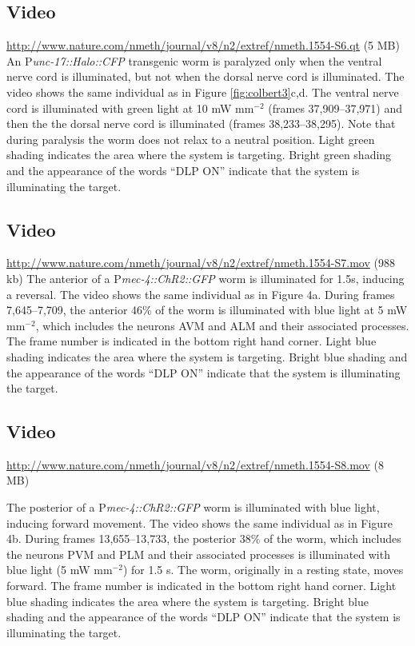\subsection{Video}\label{movie:colbert5} %

\url{http://www.nature.com/nmeth/journal/v8/n2/extref/nmeth.1554-S6.qt} (5 MB)
 An P\textit{unc-17::Halo::CFP} transgenic worm is paralyzed only when the ventral nerve cord is illuminated, but not when the dorsal nerve cord is illuminated. The video shows the same individual as in Figure \ref{fig:colbert3}c,d. The ventral nerve cord is illuminated with green light at 10 mW mm$^{−2}$ (frames 37,909–37,971) and then the the dorsal nerve cord is illuminated (frames 38,233–38,295). Note that during paralysis the worm does not relax to a neutral position. Light green shading indicates the area where the system is targeting. Bright green shading and the appearance of the words “DLP ON” indicate that the system is illuminating the target.

\subsection{Video}\label{movie:colbert6} %

\url{http://www.nature.com/nmeth/journal/v8/n2/extref/nmeth.1554-S7.mov} (988 kb)
The anterior of a P\textit{mec-4::ChR2::GFP} worm is illuminated for 1.5s, inducing a reversal. The video shows the same individual as in Figure 4a. During frames 7,645–7,709, the anterior 46\% of the worm is illuminated with blue light at 5 mW mm$^{−2}$, which includes the neurons AVM and ALM and their associated processes. The frame number is indicated in the bottom right hand corner. Light blue shading indicates the area where the system is targeting. Bright blue shading and the appearance of the words “DLP ON” indicate that the system is illuminating the target.

\subsection{Video}\label{movie:colbert7} %
\url{http://www.nature.com/nmeth/journal/v8/n2/extref/nmeth.1554-S8.mov} (8 MB)

The posterior of a P\textit{mec-4::ChR2::GFP} worm is illuminated with blue light, inducing forward movement. The video shows the same individual as in Figure 4b. During frames 13,655–13,733, the posterior 38\% of the worm, which includes the neurons PVM and PLM and their associated processes is illuminated with blue light (5 mW mm$^{−2}$) for 1.5 s. The worm, originally in a resting state, moves forward. The frame number is indicated in the bottom right hand corner. Light blue shading indicates the area where the system is targeting. Bright blue shading and the appearance of the words “DLP ON” indicate that the system is illuminating the target.

